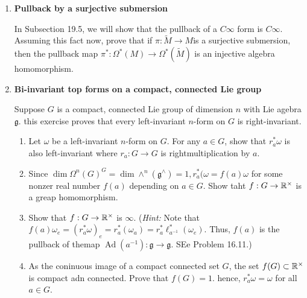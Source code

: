 \documentclass[12pt,a4paper]{report}
\begin{document}
\begin{enumerate}[label=18.\arabic*]
\begin{enumerate}[label=(\alph*)]
		\item \textbf{Pullback by a surjective submersion}
		
		In Subsection 19.5, we will show that the pullback of a $C\infty$ form is $C\infty$.  Assuming this fact now, prove that if $\pi:\tilde{M} \to M$is a surjective submersion, then the pullback map $\pi^*: \Omega^*(M)\to\Omega^*(\tilde{M})$ is an injective algebra homomorphism.
		
		\item \textbf{Bi-invariant top forms on a compact, connected Lie group}
		
		Suppose $G$ is a compact, connected Lie group of dimension $n$ with Lie agebra $\mathfrak{g}$.  this exercise proves that every left-invariant $n$-form on $G$ is right-invariant.
		\begin{enumerate}[label=(\alph*)]
		
			\item Let $\omega$ be a left-invariant $n$-form on $G$.  For any $a \in G$, show that $r_a^*\omega$ is also left-invariant where $r_a : G \to G$ is rightmultiplication by $a$.
			\item Since $\dim \Omega^n(G)^G = \dim \wedge^n(\mathfrak{g}^\wedge) = 1, r_a^*(\omega=f(a)\omega$ for some nonzer real number $f(a)$ depending on $a \in G$.  Show taht $f: G \to \mathbb{R}^\times$ is a greap homomorphism.
			\item Show that $f: G \to \mathbb{R}^\times$ is $\infty$. (\textit{Hint:} Note that $f(a)\omega_e = (r_a^*\omega)_e = r_a^*(\omega_a)=r_a^*\ell^*_{a^{-1}}(\omega_e)$.  Thus, $f(a)$ is the pullback of themap $\operatorname{Ad}(a^{-1}): \mathfrak{g}\to \mathfrak{g}$. SEe Problem 16.11.)
			
			\item As the coninuous image of a compact connected set $G$, the set $f(G) \subset \mathbb{R}^\times$ is compact adn connected.  Prove that $f(G) =1$. hence, $r_a^*\omega=\omega$ for all $ a \in G$.
		
		\end{enumerate}
	
	\end{enumerate}

\end{enumerate}
\end{document}
